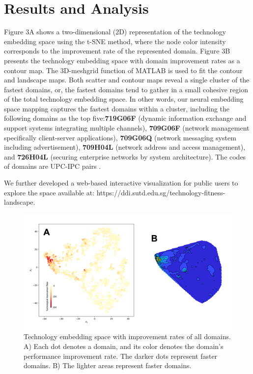 \documentclass{article}
\begin{document}
\section{Results and Analysis}
\label{sec3}

Figure 3A shows a two-dimensional (2D) representation of the technology embedding space using the t-SNE method, where the node color intensity corresponds to the improvement rate of the represented domain. Figure 3B presents the technology embedding space with domain improvement rates as a contour map. The 3D-meshgrid function of MATLAB is used to fit the contour and landscape maps. Both scatter and contour maps reveal a single cluster of the fastest domains, or, the fastest domains tend to gather in a small cohesive region of the total technology embedding space. In other words, our neural embedding space mapping captures the fastest domains within a cluster, including the following domains as the top five:\textbf{719G06F} (dynamic information exchange and support systems integrating multiple channels), \textbf{709G06F} (network management specifically client-server applications), \textbf{709G06Q} (network messaging system including advertisement), \textbf{709H04L} (network address and access management), and \textbf{726H04L} (securing enterprise networks by system architecture). The codes of domains are UPC-IPC pairs \cite{singh2021technological}.

We further developed a web-based interactive visualization for public users to explore the space available at: https://ddi.sutd.edu.sg/technology-fitness-landscape.

\begin{figure}[H]
	\centering
	\includegraphics[width=15cm]{FIG3.png}
	\caption{Technology embedding space with improvement rates of all domains. A) Each dot denotes a domain, and its color denotes the domain’s performance improvement rate. The darker dots represent faster domains. B) The lighter areas represent faster domains.}
	\label{fig:fig3}
\end{figure}
\end{document}
